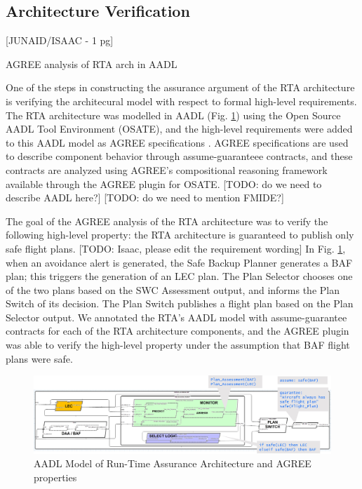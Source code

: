 \subsection{Architecture Verification}

[JUNAID/ISAAC - 1 pg]

AGREE analysis of RTA arch in AADL

One of the steps in constructing the assurance argument of the RTA architecture is verifying the architecural model with respect to formal high-level requirements.
The RTA architecture was modelled in AADL (Fig. \ref{fig:rta-agree}) using the Open Source AADL Tool Environment (OSATE),
and the high-level requirements were added to this AADL model as AGREE specifications \cite{agree2012}.
AGREE specifications are used to describe component behavior through assume-guaranteee contracts, and
these contracts are analyzed using AGREE's compositional reasoning framework available through the AGREE plugin for OSATE.
[TODO: do we need to describe AADL here?]
[TODO: do we need to mention FMIDE?]

The goal of the AGREE analysis of the RTA architecture was to verify the following high-level property:
the RTA architecture is guaranteed to publish only safe flight plans.
[TODO: Isaac, please edit the requirement wording]
In Fig. \ref{fig:rta-agree}, when an avoidance alert is generated, the Safe Backup Planner generates a BAF plan;
this triggers the generation of an LEC plan.
The Plan Selector chooses one of the two plans based on the SWC Assessment output, and informs the Plan Switch of its decision.
The Plan Switch publishes a flight plan based on the Plan Selector output.
We annotated the RTA's AADL model with assume-guarantee contracts for each of the RTA architecture components,
and the AGREE plugin was able to verify the high-level property under the assumption that BAF flight plans were safe.

\begin{figure}
	\centering
	\includegraphics[width=\textwidth]{figures/rta-agree.jpg}
	\caption{AADL Model of Run-Time Assurance Architecture and AGREE properties}
	\label{fig:rta-agree}
\end{figure}